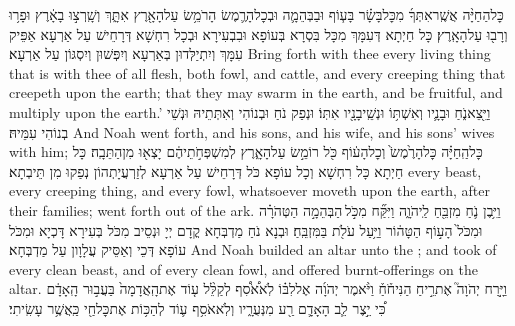 {כׇּל\maqqaf הַחַיָּ֨ה אֲשֶֽׁר\maqqaf אִתְּךָ֜ מִכׇּל\maqqaf בָּשָׂ֗ר בָּע֧וֹף וּבַבְּהֵמָ֛ה וּבְכׇל\maqqaf הָרֶ֛מֶשׂ הָרֹמֵ֥שׂ עַל\maqqaf הָאָ֖רֶץ  אִתָּ֑ךְ וְשָֽׁרְצ֣וּ בָאָ֔רֶץ וּפָר֥וּ וְרָב֖וּ עַל\maqqaf הָאָֽרֶץ׃}
{כָּל חַיְתָא דְּעִמָּךְ מִכָּל בִּסְרָא בְּעוֹפָא וּבִבְעִירָא וּבְכָל רִחְשָׁא דְּרָחֵישׁ עַל אַרְעָא אַפֵּיק עִמָּךְ וְיִתְיַלְּדוּן בְּאַרְעָא וְיִפְּשׁוּן וְיִסְגּוֹן עַל אַרְעָא׃}
{Bring forth with thee every living thing that is with thee of all flesh, both fowl, and cattle, and every creeping thing that creepeth upon the earth; that they may swarm in the earth, and be fruitful, and multiply upon the earth.’}{}
{וַיֵּ֖צֵא\maqqaf נֹ֑חַ וּבָנָ֛יו וְאִשְׁתּ֥וֹ וּנְשֵֽׁי\maqqaf בָנָ֖יו אִתּֽוֹ׃}
{וּנְפַק נֹחַ וּבְנוֹהִי וְאִתְּתֵיהּ וּנְשֵׁי בְנוֹהִי עִמֵּיהּ׃}
{And Noah went forth, and his sons, and his wife, and his sons’ wives with him;}{}
{כׇּל\maqqaf הַֽחַיָּ֗ה כׇּל\maqqaf הָרֶ֙מֶשׂ֙ וְכׇל\maqqaf הָע֔וֹף כֹּ֖ל רוֹמֵ֣שׂ עַל\maqqaf הָאָ֑רֶץ לְמִשְׁפְּחֹ֣תֵיהֶ֔ם יָצְא֖וּ מִן\maqqaf הַתֵּבָֽה׃}
{כָּל חַיְתָא כָּל רִחְשָׁא וְכָל עוֹפָא כֹּל דְּרָחֵישׁ עַל אַרְעָא לְזַרְעֲיָתְהוֹן נְפַקוּ מִן תֵּיבְתָא׃}
{every beast, every creeping thing, and every fowl, whatsoever moveth upon the earth, after their families; went forth out of the ark.}{}
{וַיִּ֥בֶן נֹ֛חַ מִזְבֵּ֖חַ לַֽיהֹוָ֑ה וַיִּקַּ֞ח מִכֹּ֣ל \legarmeh  הַבְּהֵמָ֣ה הַטְּהֹרָ֗ה וּמִכֹּל֙ הָע֣וֹף הַטָּה֔וֹר וַיַּ֥עַל עֹלֹ֖ת בַּמִּזְבֵּֽחַ׃}
{וּבְנָא נֹחַ מַדְבְּחָא קֳדָם יְיָ וּנְסֵיב מִכֹּל בְּעִירָא דָּכְיָא וּמִכֹּל עוֹפָא דְּכֵי וְאַסֵּיק עֲלָוָון עַל מַדְבְּחָא׃}
{And Noah builded an altar unto the \lord; and took of every clean beast, and of every clean fowl, and offered burnt-offerings on the altar.}{}
{וַיָּ֣רַח יְהֹוָה֮ אֶת\maqqaf רֵ֣יחַ הַנִּיחֹ֒חַ֒ וַיֹּ֨אמֶר יְהֹוָ֜ה אֶל\maqqaf לִבּ֗וֹ לֹֽא\maqqaf אֹ֠סִ֠ף לְקַלֵּ֨ל ע֤וֹד אֶת\maqqaf הָֽאֲדָמָה֙ בַּעֲב֣וּר הָֽאָדָ֔ם כִּ֠י יֵ֣צֶר לֵ֧ב הָאָדָ֛ם רַ֖ע מִנְּעֻרָ֑יו וְלֹֽא\maqqaf אֹסִ֥ף ע֛וֹד לְהַכּ֥וֹת אֶת\maqqaf כׇּל\maqqaf חַ֖י כַּֽאֲשֶׁ֥ר עָשִֽׂיתִי׃}
